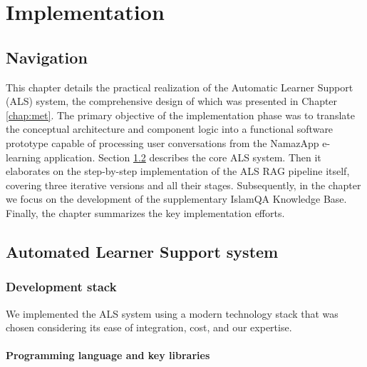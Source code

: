 \chapter{Implementation}
\label{chap:impl}

\section{Navigation}

This chapter details the practical realization of the Automatic Learner Support (ALS) system, the comprehensive design of which was presented in Chapter \ref{chap:met}. The primary objective of the implementation phase was to translate the conceptual architecture and component logic into a functional software prototype capable of processing user conversations from the NamazApp e-learning application.
Section \ref{sec:als_implementation} describes the core ALS system. Then it elaborates on the step-by-step implementation of the ALS RAG pipeline itself, covering three iterative versions and all their stages.
Subsequently, in the chapter we focus on the development of the supplementary IslamQA Knowledge Base. Finally, the chapter summarizes the key implementation efforts.

\section{Automated Learner Support system}
\label{sec:als_implementation}

\subsection{Development stack}

We implemented the ALS system using a modern technology stack that was chosen considering its ease of integration, cost, and our expertise.

\subsubsection{Programming language and key libraries}

